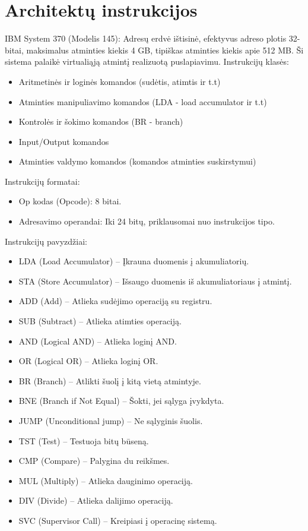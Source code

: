 \documentclass{article}
\begin{document}
\section*{Architektų instrukcijos}

IBM System 370 (Modelis 145): Adresų erdvė ištisinė, efektyvus adreso plotis 32-bitai, maksimalus atminties kiekis 4 GB, tipiškas atminties kiekis apie 512 MB. Ši sistema palaikė virtualiąją atmintį realizuotą puslapiavimu. Instrukcijų klasės:
\begin{itemize}
    \item Aritmetinės ir loginės komandos (sudėtis, atimtis ir t.t)
    \item Atminties manipuliavimo komandos (LDA - load accumulator ir t.t)
    \item Kontrolės ir šokimo komandos (BR - branch)
    \item Input/Output komandos
    \item Atminties valdymo komandos (komandos atminties suskirstymui)
\end{itemize}
Instrukcijų formatai:
\begin{itemize}
    \item Op kodas (Opcode): 8 bitai.
    \item Adresavimo operandai: Iki 24 bitų, priklausomai nuo instrukcijos tipo.
\end{itemize}
Instrukcijų pavyzdžiai:
\begin{itemize}
    \item LDA (Load Accumulator) – Įkrauna duomenis į akumuliatorių.
    \item STA (Store Accumulator) – Išsaugo duomenis iš akumuliatoriaus į atmintį.
    \item ADD (Add) – Atlieka sudėjimo operaciją su registru.
    \item SUB (Subtract) – Atlieka atimties operaciją.
    \item AND (Logical AND) – Atlieka loginį AND.
    \item OR (Logical OR) – Atlieka loginį OR.
    \item BR (Branch) – Atlikti šuolį į kitą vietą atmintyje.
    \item BNE (Branch if Not Equal) – Šokti, jei sąlyga įvykdyta.
    \item JUMP (Unconditional jump) – Ne sąlyginis šuolis.
    \item TST (Test) – Testuoja bitų būseną.
    \item CMP (Compare) – Palygina du reikšmes.
    \item MUL (Multiply) – Atlieka dauginimo operaciją.
    \item DIV (Divide) – Atlieka dalijimo operaciją.
    \item SVC (Supervisor Call) – Kreipiasi į operacinę sistemą.

\end{itemize}
\end{document}
